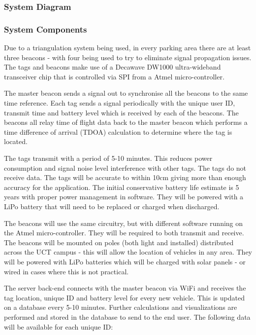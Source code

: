 \subsubsection{System Diagram}
\subsubsection{System Components}
Due to a triangulation system being used, in every parking area there are at least three beacons - with four being used to try to eliminate signal propagation issues. The tags and beacons make use of a Decawave DW1000 ultra-wideband transceiver chip that is controlled via SPI from a Atmel micro-controller. 

The master beacon sends a signal out to synchronise all the beacons to the same time reference. Each tag sends a signal periodically with the unique user ID, transmit time and battery level which is received by each of the beacons. The beacons all relay time of flight data back to the master beacon which performs a time difference of arrival (TDOA) calculation to determine where the tag is located.\cite{decawave-presentation}

The tags transmit with a period of 5-10 minutes. This reduces power consumption and signal noise level interference with other tags. The tags do not receive data. The tags will be accurate to within 10cm giving more than enough accuracy for the application. The initial conservative battery life estimate is 5 years with proper power management in software. They will be powered with a LiPo battery that will need to be replaced or charged when discharged.

The beacons will use the same circuitry, but with different software running on the Atmel micro-controller. They will be required to both transmit and receive. The beacons will be mounted on poles (both light and installed) distributed across the UCT campus - this will allow the location of vehicles in any area. They will be powered with LiPo batteries which will be charged with solar panels - or wired in cases where this is not practical.

The server back-end connects with the master beacon via WiFi and receives the tag location, unique ID and battery level for every new vehicle. This is updated on a database every 5-10 minutes. Further calculations and visualizations are performed and stored in the database to send to the end user. The following data will be available for each unique ID:

